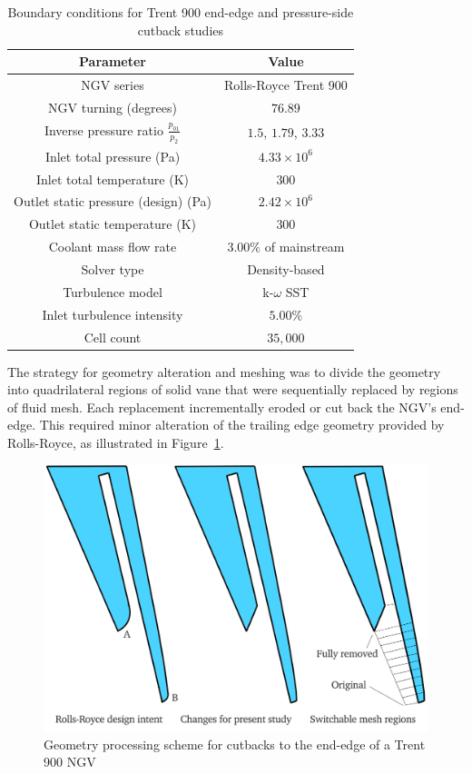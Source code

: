 \documentclass[a4paper, 11pt, oneside]{report}
\begin{document}
\begin{table}[H]
\caption{Boundary conditions for Trent 900 end-edge and pressure-side cutback studies}
\label{ss_cutbacks_parameters}
\begin{center}
\begin{tabular}{|c|c|}
\hline
Parameter & Value\\
\hline
NGV series & Rolls-Royce Trent 900\\
NGV turning (degrees) & $76.89$\\
Inverse pressure ratio $\frac{p_{01}}{p_2}$ & $1.5$, $1.79$, $3.33$\\
Inlet total pressure (Pa) & $4.33 \times 10^6$\\
Inlet total temperature (K) & $300$\\
Outlet static pressure (design) (Pa) & $2.42 \times 10^6$\\
Outlet static temperature (K) & $300$\\
Coolant mass flow rate & $3.00\%$ of mainstream\\
Solver type & Density-based\\
Turbulence model & k-$\omega$ SST\\
Inlet turbulence intensity & $5.00\%$\\
Cell count & $35,000$\\
\hline
\end{tabular}
\end{center}
\end{table}

The strategy for geometry alteration and meshing was to divide the geometry into quadrilateral regions of solid vane that were sequentially replaced by regions of fluid mesh. Each replacement incrementally eroded or cut back the NGV's end-edge. This required minor alteration of the trailing edge geometry provided by Rolls-Royce, as illustrated in Figure~\ref{fig:T900_ss_cutbacks_geometry}.

\begin{figure}[H]
      \centering
      \includegraphics[width=.9\textwidth]{figs/T900_ss_cutbacks_geometry.png}
      \caption{Geometry processing scheme for cutbacks to the end-edge of a Trent 900 NGV}
      \label{fig:T900_ss_cutbacks_geometry}
\end{figure}
\end{document}
